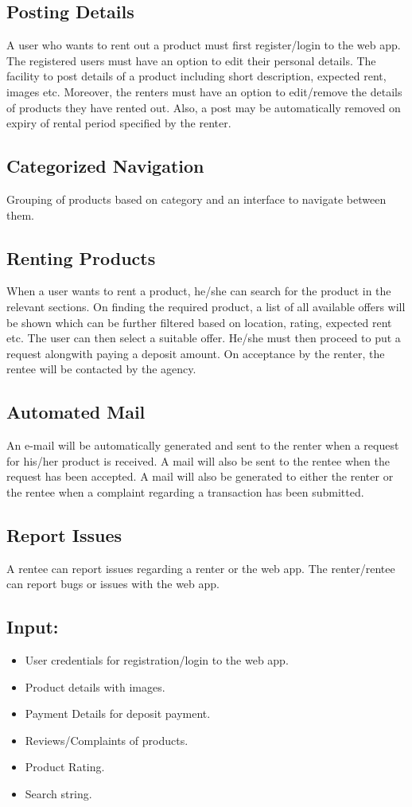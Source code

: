 \documentclass[11pt]{report}
\begin{document}
\subsection{Posting Details}
A user who wants to rent out a product must first register/login to the web app. The registered users must have an option to edit their personal details.
The facility to post details of a product including short description, expected rent, images etc. Moreover, the renters must have an option to edit/remove the details of products they have rented out. Also, a post may be automatically removed on expiry of rental period specified by the renter.
\subsection{Categorized Navigation }
Grouping of products based on category and an interface to navigate between them.

\subsection{Renting Products}
When a user wants to rent a product, he/she can search for the product in the relevant sections. On finding the required product, a list of all available offers will be shown which can be further filtered based on location, rating, expected rent etc. The user can then select a suitable offer.
He/she must then proceed to put a request alongwith paying a deposit amount. On acceptance by the renter, the rentee will be contacted by the agency.
\subsection{Automated Mail}
An e-mail will be automatically generated and sent to the renter when a request for his/her product is received. A mail will also be sent to the rentee  when the request has been accepted. A mail will also be generated to either the renter or the rentee when a complaint regarding a transaction has been submitted. 
\subsection{\label{mlr}Report Issues}
A rentee can report issues regarding a renter or the web app. The renter/rentee can report bugs or issues with the web app. \\

\subsection{\textbf{Input:}}
\begin{itemize}
  \item User credentials for registration/login to the web app.
  \item Product details with images.
  \item Payment Details for deposit payment.
  \item Reviews/Complaints of products.
  \item Product Rating.
  \item Search string.
\end{itemize}
\end{document}
